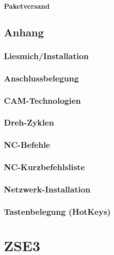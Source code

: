 \documentclass[a5paper]{book}
\begin{document}
		\subsection{Paketversand} 
 
\chapter{Anhang}
	\section{Liesmich/Installation} 
	\section{Anschlussbelegung} 
	\section{CAM-Technologien} 
	\section{Dreh-Zyklen} 
	\section{NC-Befehle} 
	\section{NC-Kurzbefehlsliste} 
	\section{Netzwerk-Installation} 
	\section{Tastenbelegung (HotKeys)} 
 
 
\part{ZSE3}
\end{document}
